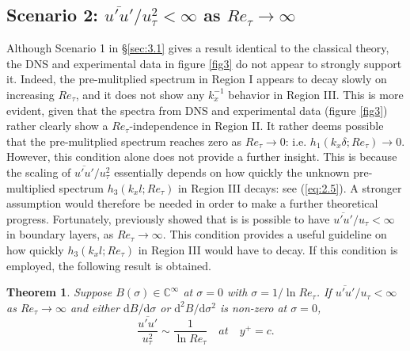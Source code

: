 \documentclass{jfm}
\newtheorem{theorem}{Theorem}
\begin{document}
\subsection{Scenario 2: $\overline{u'u'}/u_\tau^2 < \infty$ as $Re_\tau \rightarrow \infty$}\label{sec:3.2}
Although Scenario 1 in \S\ref{sec:3.1} gives a result identical to the classical theory, the DNS and experimental data in figure \ref{fig3} do not appear to strongly support it. Indeed, the pre-mulitplied spectrum in Region I appears to decay slowly on increasing $Re_\tau$, and it does not show any $k_x^{-1}$ behavior in Region III. This is more evident, given that the spectra from DNS and experimental data (figure \ref{fig3}) rather clearly show a $Re_\tau$-independence in Region II. It rather deems possible that the pre-mulitplied spectrum reaches zero as $Re_\tau \rightarrow 0$: i.e. $h_1(k_x \delta; Re_\tau) \rightarrow 0$. However, this condition alone does not provide a further insight. This is because the scaling of $\overline{u'u'}/u_\tau^2$ essentially depends on how quickly the unknown pre-multiplied spectrum $h_3(k_x l; Re_\tau)$ in Region III decays: see (\ref{eq:2.5}). A stronger assumption would therefore be needed in order to make a further theoretical progress. Fortunately, \cite{Monkewitz2015} previously showed that is is possible to have $\overline{u'u'}/u_\tau < \infty$ in boundary layers, as $Re_\tau \rightarrow \infty$. This condition provides a useful guideline on how quickly $h_3(k_x l; Re_\tau)$ in Region III would have to decay. If this condition is employed, the following result is obtained.

\begin{theorem}\label{st:3}
\textit{Suppose $B(\sigma)\in \mathbb{C}^\infty$ at $\sigma=0$ with $\sigma=1/\ln Re_\tau$. If $\overline{u'u'}/u_\tau < \infty$ as $Re_\tau \rightarrow \infty$ and either $\mathrm{d}B/\mathrm{d}\sigma$ or $\mathrm{d}^2 B/\mathrm{d}\sigma^2$ is non-zero at $\sigma=0$,
\begin{equation}
\frac{\overline{u'u'}}{u_\tau^2} \sim \frac{1}{\ln Re_{\tau}} \quad at \quad y^+=c.
\end{equation}
}
\end{theorem}
\end{document}
